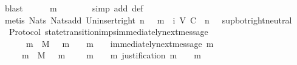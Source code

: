 \begin{isabellebody}
\ blast\isanewline
\ \ \isamarkupfalse%
\ {\isachardoublequoteopen}{\isasymsigma}\ {\isasymunion}\ {\isacharbraceleft}m{\isacharbraceright}\ {\isasymin}\ {\isasymSigma}{\isachardoublequoteclose}\isanewline
\ \ \ \ \isamarkupfalse%
\ {\isacharparenleft}simp\ add{\isacharcolon}\ {\isasymSigma}{\isacharunderscore}def{\isacharparenright}\isanewline
\ \ \ \ \isamarkupfalse%
\ {\isacharparenleft}metis\ Nats{\isacharunderscore}{}\ Nats{\isacharunderscore}add\ Un{\isacharunderscore}insert{\isacharunderscore}right\ {\isacartoucheopen}{\isasymexists}n{\isasymin}{\isasymnat}{\isachardot}\ {\isasymsigma}\ {\isasymunion}\ {\isacharbraceleft}m{\isacharbraceright}\ {\isasymin}\ {\isasymSigma}i\ {\isacharparenleft}V{\isacharcomma}\ C{\isacharcomma}\ {\isasymepsilon}{\isacharparenright}\ {\isacharparenleft}n\ {\isacharplus}\ {}{\isacharparenright}{\isacartoucheclose}\ sup{\isacharunderscore}bot{\isachardot}right{\isacharunderscore}neutral{\isacharparenright}\isanewline
{}\isamarkupfalse%
%
\endisatagproof
{\isafoldproof}%
%
\isadelimproof
\isanewline
%
\endisadelimproof
\isanewline
{}\isamarkupfalse%
\ {\isacharparenleft}\ Protocol{\isacharparenright}\ state{\isacharunderscore}transition{\isacharunderscore}imps{\isacharunderscore}immediately{\isacharunderscore}next{\isacharunderscore}message{\isacharcolon}\ \isanewline
\ \ {\isachardoublequoteopen}{\isasymforall}\ {\isasymsigma}\ {\isasymin}{\isasymSigma}{\isachardot}\ {\isasymforall}\ m\ {\isasymin}\ M{\isachardot}\ {\isasymsigma}\ {\isasymunion}\ {\isacharbraceleft}m{\isacharbraceright}\ {\isasymin}\ {\isasymSigma}\ {\isasymand}\ m\ {\isasymnotin}\ {\isasymsigma}\ {\isasymlongrightarrow}\ immediately{\isacharunderscore}next{\isacharunderscore}message\ {\isacharparenleft}{\isasymsigma}{\isacharcomma}m{\isacharparenright}{\isachardoublequoteclose}\isanewline
%
\isadelimproof
%
\endisadelimproof
%
\isatagproof
{}\isamarkupfalse%
\ {\isacharminus}\ \isanewline
\ \ \isamarkupfalse%
\ {\isachardoublequoteopen}{\isasymforall}\ {\isasymsigma}\ {\isasymin}{\isasymSigma}{\isachardot}\ {\isasymforall}\ m\ {\isasymin}\ M{\isachardot}\ {\isasymsigma}\ {\isasymunion}\ {\isacharbraceleft}m{\isacharbraceright}\ {\isasymin}\ {\isasymSigma}\ {\isasymlongrightarrow}\ {\isacharparenleft}{\isasymforall}\ m{\isacharprime}\ {\isasymin}\ {\isasymsigma}\ {\isasymunion}\ {\isacharbraceleft}m{\isacharbraceright}{\isachardot}\ justification\ m{\isacharprime}\ {\isasymsubseteq}\ {\isasymsigma}\ {\isasymunion}\ {\isacharbraceleft}m{\isacharbraceright}{\isacharparenright}{\isachardoublequoteclose}\isanewline

\end{isabellebody}
